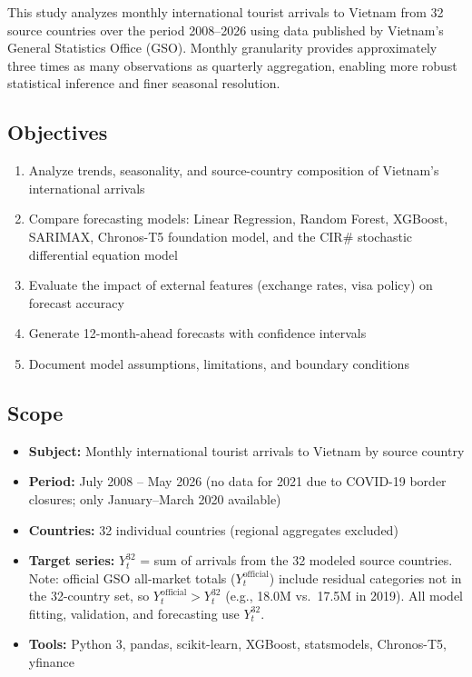 \documentclass[
]{article}
\providecommand{\tightlist}{%
  \setlength{\itemsep}{0pt}\setlength{\parskip}{0pt}}
\begin{document}
This study analyzes monthly international tourist arrivals to Vietnam
from 32 source countries over the period 2008--2026 using data published
by Vietnam's General Statistics Office (GSO). Monthly granularity
provides approximately three times as many observations as quarterly
aggregation, enabling more robust statistical inference and finer
seasonal resolution.

\subsection{Objectives}\label{objectives}

\begin{enumerate}
\def\labelenumi{\arabic{enumi}.}
\tightlist
\item
  Analyze trends, seasonality, and source-country composition of
  Vietnam's international arrivals
\item
  Compare forecasting models: Linear Regression, Random Forest, XGBoost,
  SARIMAX, Chronos-T5 foundation model, and the CIR\# stochastic
  differential equation model
\item
  Evaluate the impact of external features (exchange rates, visa policy)
  on forecast accuracy
\item
  Generate 12-month-ahead forecasts with confidence intervals
\item
  Document model assumptions, limitations, and boundary conditions
\end{enumerate}

\subsection{Scope}\label{scope}

\begin{itemize}
\tightlist
\item
  \textbf{Subject:} Monthly international tourist arrivals to Vietnam by
  source country
\item
  \textbf{Period:} July 2008 -- May 2026 (no data for 2021 due to
  COVID-19 border closures; only January--March 2020 available)
\item
  \textbf{Countries:} 32 individual countries (regional aggregates
  excluded)
\item
  \textbf{Target series:} \(Y^{32}_t\) = sum of arrivals from the 32
  modeled source countries. Note: official GSO all-market totals
  (\(Y^{\mathrm{official}}_t\)) include residual categories not in the
  32-country set, so \(Y^{\mathrm{official}}_t > Y^{32}_t\) (e.g., 18.0M
  vs.~17.5M in 2019). All model fitting, validation, and forecasting use
  \(Y^{32}_t\).
\item
  \textbf{Tools:} Python 3, pandas, scikit-learn, XGBoost, statsmodels,
  Chronos-T5, yfinance
\end{itemize}
\end{document}
